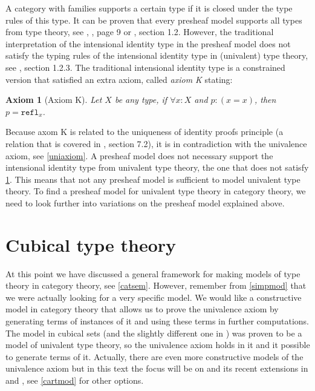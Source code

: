 \documentclass[11pt,a4paper,twoside,xetex,draft]{book}
\newcommand{\keyword}[1]{\emph{#1}\index{#1}}
\newtheorem{axiom}[theorem]{Axiom}
\newcommand{\op}[1]{\mathtt{#1}}
\begin{document}
A category with families supports a certain type if it is closed under the type rules of this type.  It can be proven that every presheaf model supports all types from type theory, see \cite{Hofmann1997}, \cite{Nuyts2018}, page 9 or \cite{Huber2016}, section 1.2. However, the traditional interpretation of the intensional identity type in the presheaf model does not satisfy the typing rules of the intensional identity type in (univalent) type theory, see \cite{Huber2016}, section 1.2.3. The traditional intensional identity type is a constrained version that satisfied an extra axiom, called \keyword{axiom K} stating: 

\begin{axiom}[Axiom K]\label{axiomk}
Let $X$ be any type, if $\forall x : X$ and $p : (x = x)$, then $p = \op{refl}_x$. 
\end{axiom}

Because axom K is related to the uniqueness of identity proofs principle (a relation that is covered in \cite{Voevodsky2013}, section 7.2), it is in contradiction with the univalence axiom, see \cref{uniaxiom}. A presheaf model does not necessary support the intensional identity type from univalent type theory, the one that does not satisfy \cref{axiomk}. This means that not any presheaf model is sufficient to model univalent type theory. To find a presheaf model for univalent type theory in category theory, we need to look further into variations on the presheaf model explained above.  

\chapter{Cubical type theory}\label{cubical}

At this point we have discussed a general framework for making models of type theory in category theory, see \cref{catsem}. However, remember from \cref{simpmod} that we were actually looking for a very specific model. We would like a constructive model in category theory that allows us to prove the univalence axiom by generating terms of instances of it and using these terms in further computations. The model in cubical sets \cite{Bezem2014} (and the slightly different one in \cite{Cohen2016}) was proven to be a model of univalent type theory, so the univalence axiom holds in it and it possible to generate terms of it. Actually, there are even more constructive models of the univalence axiom but in this text the focus will be on \cite{Cohen2016} and its recent extensions in \cite{Coquand2018} and \cite{Moertberg2018}, see \cref{cartmod} for other options. 
\end{document}
